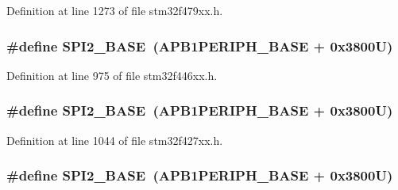 Definition at line 1273 of file stm32f479xx.\+h.

\subsubsection[{\texorpdfstring{S\+P\+I2\+\_\+\+B\+A\+SE}{SPI2_BASE}}]{\setlength{\rightskip}{0pt plus 5cm}\#define S\+P\+I2\+\_\+\+B\+A\+SE~({\bf A\+P\+B1\+P\+E\+R\+I\+P\+H\+\_\+\+B\+A\+SE} + 0x3800\+U)}\hypertarget{group___peripheral__memory__map_gac3e357b4c25106ed375fb1affab6bb86}{}\label{group___peripheral__memory__map_gac3e357b4c25106ed375fb1affab6bb86}


Definition at line 975 of file stm32f446xx.\+h.

\subsubsection[{\texorpdfstring{S\+P\+I2\+\_\+\+B\+A\+SE}{SPI2_BASE}}]{\setlength{\rightskip}{0pt plus 5cm}\#define S\+P\+I2\+\_\+\+B\+A\+SE~({\bf A\+P\+B1\+P\+E\+R\+I\+P\+H\+\_\+\+B\+A\+SE} + 0x3800\+U)}\hypertarget{group___peripheral__memory__map_gac3e357b4c25106ed375fb1affab6bb86}{}\label{group___peripheral__memory__map_gac3e357b4c25106ed375fb1affab6bb86}


Definition at line 1044 of file stm32f427xx.\+h.

\subsubsection[{\texorpdfstring{S\+P\+I2\+\_\+\+B\+A\+SE}{SPI2_BASE}}]{\setlength{\rightskip}{0pt plus 5cm}\#define S\+P\+I2\+\_\+\+B\+A\+SE~({\bf A\+P\+B1\+P\+E\+R\+I\+P\+H\+\_\+\+B\+A\+SE} + 0x3800\+U)}\hypertarget{group___peripheral__memory__map_gac3e357b4c25106ed375fb1affab6bb86}{}\label{group___peripheral__memory__map_gac3e357b4c25106ed375fb1affab6bb86}


